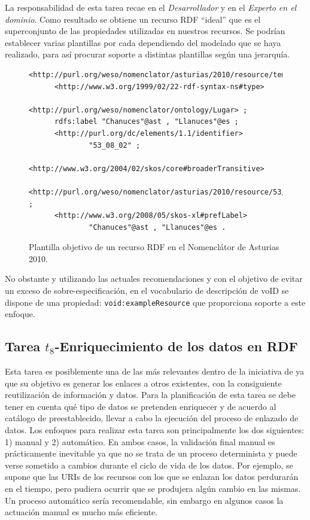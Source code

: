 La responsabilidad de esta tarea recae en el \textit{Desarrollador} y en el \textit{Experto en el dominio}. Como resultado se obtiene un 
recurso RDF ``ideal'' que es el superconjunto de las propiedades utilizadas en nuestros recursos. Se podrían establecer 
varias plantillas por cada \dataset dependiendo del modelado que se haya realizado, para así procurar soporte a distintas plantillas según una jerarquía.

\begin{figure}[!htp]
\begin{lstlisting} 
<http://purl.org/weso/nomenclator/asturias/2010/resource/template>
      <http://www.w3.org/1999/02/22-rdf-syntax-ns#type>
              <http://purl.org/weso/nomenclator/ontology/Lugar> ;
      rdfs:label "Chanuces"@ast , "Llanuces"@es ;
      <http://purl.org/dc/elements/1.1/identifier>
              "53_08_02" ;
      <http://www.w3.org/2004/02/skos/core#broaderTransitive>
              <http://purl.org/weso/nomenclator/asturias/2010/resource/53/08/00> ;
      <http://www.w3.org/2008/05/skos-xl#prefLabel>
              "Chanuces"@ast , "Llanuces"@es .
\end{lstlisting}
	\caption{Plantilla objetivo de un recurso RDF en el Nomenclátor de Asturias 2010.}
	\label{fig:modelo-nomen-template}
\end{figure}

No obstante y utilizando las actuales recomendaciones y con el objetivo de evitar un exceso de sobre-especificación, en el vocabulario 
de descripción de \datasets voID se dispone de una propiedad: \texttt{void:exampleResource} que proporciona soporte a este enfoque.

\subsection{Tarea $t_8$-Enriquecimiento de los datos en RDF}
Esta tarea es posiblemente una de las más relevantes dentro de la iniciativa de \linkeddata ya que su objetivo
es generar los enlaces a otros \datasets existentes, con la consiguiente reutilización de información
y datos. Para la planificación de esta tarea se debe tener en cuenta qué tipo de datos se pretenden 
enriquecer y de acuerdo al catálogo de \datasets preestablecido, llevar a cabo la ejecución
del proceso de enlazado de datos. Los enfoques para realizar esta tarea son principalmente los dos siguientes:
1) manual y 2) automático. En ambos casos, la validación final manual es prácticamente inevitable ya que no se trata de un proceso determinista y puede verse sometido a cambios durante el ciclo de vida
de los datos. Por ejemplo, se supone que las \gls{URI}s de los recursos con los que se enlazan los datos 
perdurarán en el tiempo, pero pudiera ocurrir que se produjera algún cambio en las mismas. Un proceso
automático sería recomendable, sin embargo en algunos casos la actuación manual es mucho más eficiente.

